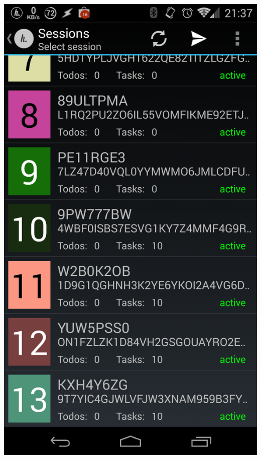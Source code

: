 \hfill
\begin{minipage}[t]{0.45\textwidth}
\centering
	\includegraphics[width = \linewidth]{img/android/lib_test}
	\label{fig:lib_test}
\end{minipage}

